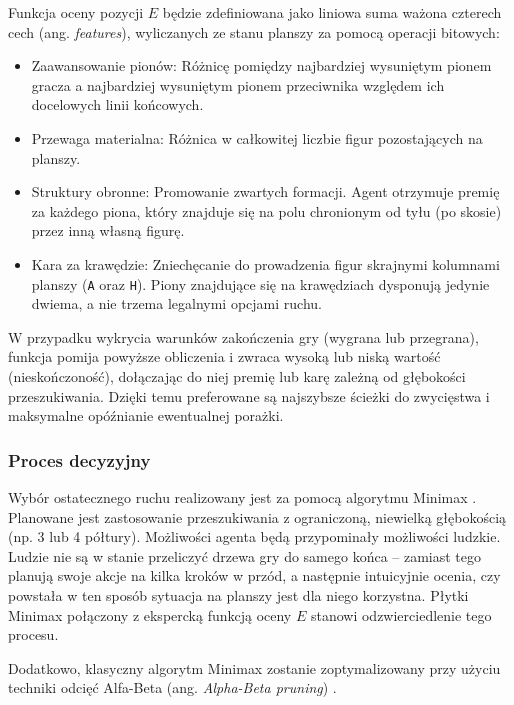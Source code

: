 \documentclass{article}
\begin{document}
Funkcja oceny pozycji $E$ będzie zdefiniowana jako liniowa suma ważona czterech cech (ang. \textit{features}), wyliczanych ze stanu planszy za pomocą operacji bitowych:

\begin{itemize}
    \item Zaawansowanie pionów: Różnicę pomiędzy najbardziej wysuniętym pionem gracza a najbardziej wysuniętym pionem przeciwnika względem ich docelowych linii końcowych.
    \item Przewaga materialna: Różnica w całkowitej liczbie figur pozostających na planszy.
    \item Struktury obronne: Promowanie zwartych formacji. Agent otrzymuje premię za każdego piona, który znajduje się na polu chronionym od tyłu (po skosie) przez inną własną figurę.
    \item Kara za krawędzie: Zniechęcanie do prowadzenia figur skrajnymi kolumnami planszy (\texttt{A} oraz \texttt{H}). Piony znajdujące się na krawędziach dysponują jedynie dwiema, a nie trzema legalnymi opcjami ruchu.
\end{itemize}

\noindent
W przypadku wykrycia warunków zakończenia gry (wygrana lub przegrana), funkcja pomija powyższe obliczenia i zwraca wysoką lub niską wartość (nieskończoność), dołączając do niej premię lub karę zależną od głębokości przeszukiwania. Dzięki temu preferowane są najszybsze ścieżki do zwycięstwa i maksymalne opóźnianie ewentualnej porażki.

\subsubsection{Proces decyzyjny}

Wybór ostatecznego ruchu realizowany jest za pomocą algorytmu Minimax \cite{russell2010artificial}. Planowane jest zastosowanie przeszukiwania z ograniczoną, niewielką głębokością (np. 3 lub 4 półtury). Możliwości agenta będą przypominały możliwości ludzkie. Ludzie nie są w stanie przeliczyć drzewa gry do samego końca -- zamiast tego planują swoje akcje na kilka kroków w przód, a następnie intuicyjnie ocenia, czy powstała w ten sposób sytuacja na planszy jest dla niego korzystna. Płytki Minimax połączony z ekspercką funkcją oceny $E$ stanowi odzwierciedlenie tego procesu.

Dodatkowo, klasyczny algorytm Minimax zostanie zoptymalizowany przy użyciu techniki odcięć Alfa-Beta (ang. \textit{Alpha-Beta pruning}) \cite{knuth1975alpha}.
\end{document}
